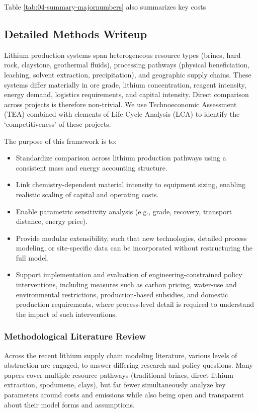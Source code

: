 \documentclass{article}
\renewcommand\_{\textunderscore\allowbreak}
\begin{document}
Table \ref{tab:04-summary-majornumbers} also summarizes key costs 

\clearpage
\subsection{Detailed Methods Writeup}\label{app:04-methods}

Lithium production systems span heterogeneous resource types (brines, hard rock, claystone, geothermal fluids), processing pathways (physical beneficiation, leaching, solvent extraction, precipitation), and geographic supply chains. These systems differ materially in ore grade, lithium concentration, reagent intensity, energy demand, logistics requirements, and capital intensity. Direct comparison across projects is therefore non-trivial. We use Technoeconomic Assessment (TEA) combined with elements of Life Cycle Analysis (LCA) to identify the `competitiveness' of these projects.

The purpose of this framework is to:
\begin{itemize}
    \item Standardize comparison across lithium production pathways using a consistent mass and energy accounting structure.
    \item Link chemistry-dependent material intensity to equipment sizing, enabling realistic scaling of capital and operating costs.
    \item Enable parametric sensitivity analysis (e.g., grade, recovery, transport distance, energy price).
    \item Provide modular extensibility, such that new technologies, detailed process modeling, or site-specific data can be incorporated without restructuring the full model.
    \item Support implementation and evaluation of engineering-constrained policy interventions, including measures such as carbon pricing, water-use and environmental restrictions, production-based subsidies, and domestic production requirements, where process-level detail is required to understand the impact of such interventions.
\end{itemize}

\subsubsection{Methodological Literature Review}\label{app:04-methods-litreview}

Across the recent lithium supply chain modeling literature, various levels of abstraction are engaged, to answer differing research and policy questions. Many papers cover multiple resource pathways (traditional brines, direct lithium extraction, spodumene, clays), but far fewer simultaneously analyze key parameters around costs and emissions while also being open and transparent about their model forms and assumptions.
\end{document}
